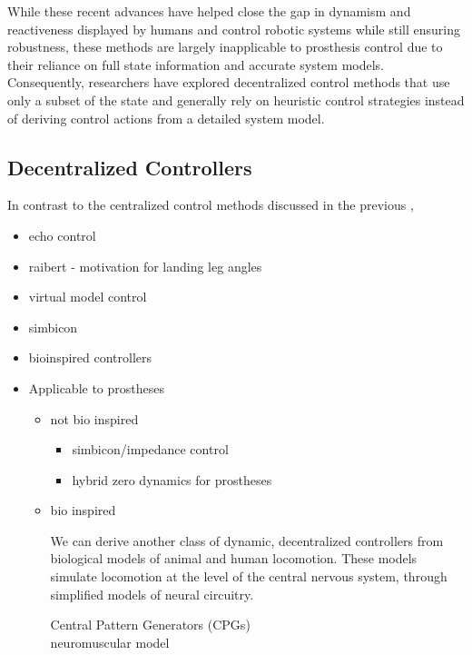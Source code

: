 While these recent advances have helped close the gap in dynamism and
reactiveness displayed by humans and control robotic systems while still
ensuring robustness, these methods are largely inapplicable to prosthesis
control due to their reliance on full state information and accurate system
models.  Consequently, researchers have explored decentralized control methods
that use only a subset of the state and generally rely on heuristic control
strategies instead of deriving control actions from a detailed system model. 

\subsection{Decentralized Controllers}\label{sec:back_decentralized_control}
In contrast to the centralized control methods discussed in the previous
, 


    \begin{itemize}
        \item echo control
    \end{itemize}

    \begin{itemize}
        \item raibert - motivation for landing leg angles
        \item virtual model control
        \item simbicon
        \item bioinspired controllers

        \item Applicable to prostheses
        \begin{itemize}
            \item not bio inspired
                \begin{itemize}
                    \item simbicon/impedance control
                    \item hybrid zero dynamics for prostheses
                \end{itemize}

            \item bio inspired

                We can derive another class of dynamic, decentralized
                controllers from biological models of animal and human
                locomotion. These models simulate locomotion at the level of the
                central nervous system, through simplified models of neural
                circuitry. 
                \begin{description}
                    \item[Central Pattern Generators (CPGs)]
                        
                    \item[neuromuscular model] 
                \end{description}
        \end{itemize}
   \end{itemize}

